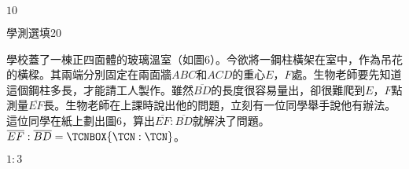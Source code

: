 \begin{QUESTIONS}
\begin{QUESTION}
\begin{QBODY}
        \end{QBODY}
        \begin{QFROMS}
        \end{QFROMS}
        \begin{QTAGS}\end{QTAGS}
        \begin{QANS}
            $10$
        \end{QANS}
        \begin{QSOLLIST}
        \end{QSOLLIST}
        \begin{QEMPTYSPACE}
        \end{QEMPTYSPACE}
    \end{QUESTION}
    \begin{QUESTION}
        \begin{ExamInfo}{85}{學測}{選填}{20}
        \end{ExamInfo}
        \begin{ExamAnsRateInfo}{}{}{}{}
        \end{ExamAnsRateInfo}
        \begin{QBODY}
            學校蓋了一棟正四面體的玻璃溫室（如圖6）。今欲將一鋼柱橫架在室中，作為吊花的橫樑。其兩端分別固定在兩面牆$ABC$和$ACD$的重心$E$，$F$處。生物老師要先知道這個鋼柱多長，才能請工人製作。雖然$\overline{BD}$的長度很容易量出，卻很難爬到$E$，$F$點測量$\overline{EF}$長。生物老師在上課時說出他的問題，立刻有一位同學舉手說他有辦法。這位同學在紙上劃出圖6，算出$\overline{EF}:\overline{BD }$就解決了問題。$\overline{EF}:\overline{BD }= \TCNBOX{\TCN:\TCN}$。
        \end{QBODY}
        \begin{QFROMS}
        \end{QFROMS}
        \begin{QTAGS}\end{QTAGS}
        \begin{QANS}
            $1:3$
        \end{QANS}
        \begin{QSOLLIST}
        \end{QSOLLIST}
        \begin{QEMPTYSPACE}
        \end{QEMPTYSPACE}
    \end{QUESTION}
\end{QUESTIONS}